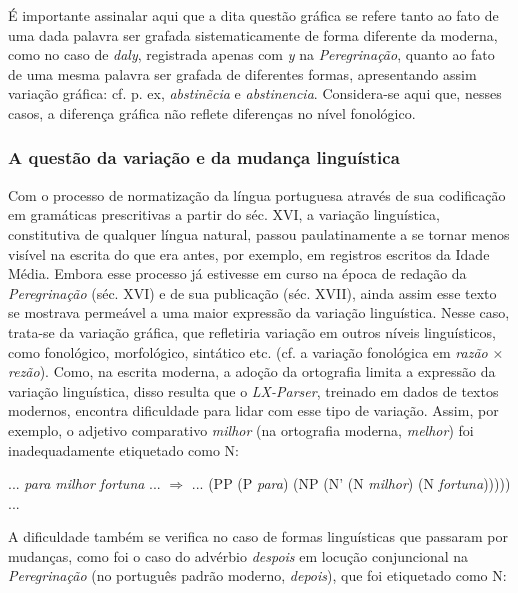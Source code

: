 \documentclass[portuguese]{textolivre}
\begin{document}
É importante assinalar aqui que a dita questão gráfica se refere tanto ao fato de uma dada palavra ser grafada sistematicamente de forma diferente da moderna, como no caso de \textit{daly}, registrada apenas com \textit{y} na \textit{Peregrinação}, quanto ao fato de uma mesma palavra ser grafada de diferentes formas, apresentando assim variação gráfica: cf. p. ex, \textit{abstinẽcia} e \textit{abstinencia}. Considera-se aqui que, nesses casos, a diferença gráfica não reflete diferenças no nível fonológico.

\subsubsection{A questão da variação e da mudança linguística}

Com o processo de normatização da língua portuguesa através de sua codificação em gramáticas prescritivas a partir do séc. XVI, a variação linguística, constitutiva de qualquer língua natural, passou paulatinamente a se tornar menos visível na escrita do que era antes, por exemplo, em registros escritos da Idade Média. Embora esse processo já estivesse em curso na época de redação da \textit{Peregrinação} (séc. XVI) e de sua publicação (séc. XVII), ainda assim esse texto se mostrava permeável a uma maior expressão da variação linguística. Nesse caso, trata-se da variação gráfica, que refletiria variação em outros níveis linguísticos, como fonológico, morfológico, sintático etc. (cf. a variação fonológica em \textit{razão} × \textit{rezão}). Como, na escrita moderna, a adoção da ortografia limita a expressão da variação linguística, disso resulta que o \textit{LX-Parser}, treinado em dados de textos modernos, encontra dificuldade para lidar com esse tipo de variação. Assim, por exemplo, o adjetivo comparativo \textit{milhor} (na ortografia moderna, \textit{melhor}) foi inadequadamente etiquetado como N:

\begin{description}[topsep=10pt, parsep=2pt, itemindent=!]
\item[(13)\label{13}] ... \textit{para milhor fortuna} ... $\Rightarrow$ ... (PP (P \textit{para}) (NP (N' (N \textit{milhor}) (N \textit{fortuna}))))) ...
\end{description}

A dificuldade também se verifica no caso de formas linguísticas que passaram por mudanças, como foi o caso do advérbio \textit{despois} em locução conjuncional na \textit{Peregrinação} (no português padrão moderno, \textit{depois}), que foi etiquetado como N:
\end{document}
